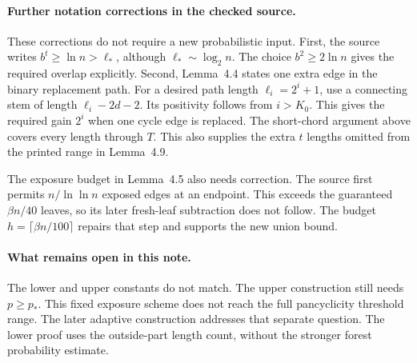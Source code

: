 \paragraph{Further notation corrections in the checked source.}
These corrections do not require a new probabilistic input.
First, the source writes $b^t\ge\ln n>\ell_*$, although $\ell_*\sim\log_2 n$.
The choice $b^2\ge2\ln n$ gives the required overlap explicitly.
Second, Lemma~4.4 states one extra edge in the binary replacement path.
For a desired path length $\ell_i=2^i+1$, use a connecting stem of length $\ell_i-2d-2$.
Its positivity follows from $i>K_0$.
This gives the required gain $2^i$ when one cycle edge is replaced.
The short-chord argument above covers every length through $T$.
This also supplies the extra $t$ lengths omitted from the printed range in Lemma~4.9.

The exposure budget in Lemma~4.5 also needs correction.
The source first permits $n/\ln\ln n$ exposed edges at an endpoint.
This exceeds the guaranteed $\beta n/40$ leaves, so its later fresh-leaf subtraction does not follow.
The budget $h=\lceil\beta n/100\rceil$ repairs that step and supports the new union bound.

\paragraph{What remains open in this note.}
The lower and upper constants do not match.
The upper construction still needs $p\ge p_*$.
This fixed exposure scheme does not reach the full pancyclicity threshold range.
The later adaptive construction addresses that separate question.
The lower proof uses the outside-part length count, without the stronger forest probability estimate.


